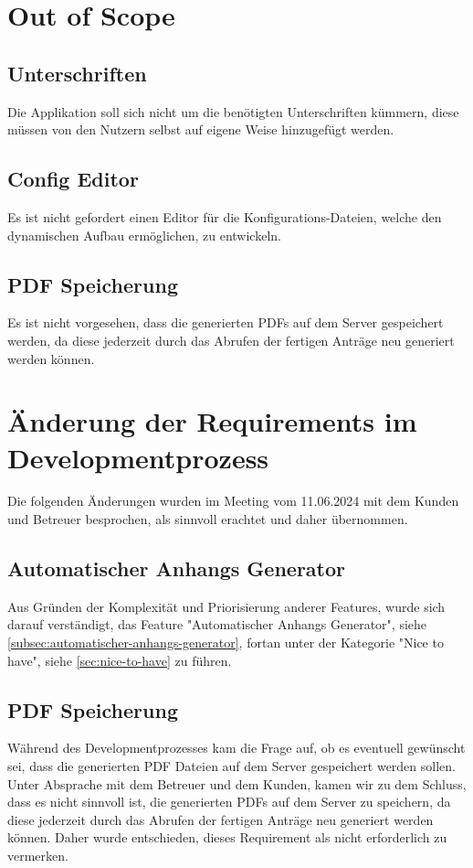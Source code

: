 \section{Out of Scope}\label{sec:nicht-anforderung}
\subsection{Unterschriften}\label{subsec:unterschriften}
Die Applikation soll sich nicht um die benötigten Unterschriften kümmern,
diese müssen von den Nutzern selbst auf eigene Weise hinzugefügt werden.
\subsection{Config Editor}\label{subsec:config-editor}
Es ist nicht gefordert einen Editor für die Konfigurations-Dateien, welche den dynamischen Aufbau ermöglichen, zu entwickeln.


\subsection{PDF Speicherung}\label{subsec: pdf speicherung}
Es ist nicht vorgesehen, dass die generierten \ac{PDF}s auf dem Server gespeichert werden, 
da diese jederzeit durch das Abrufen der fertigen Anträge neu generiert werden können.

\section{Änderung der Requirements im Developmentprozess}
Die folgenden Änderungen wurden im Meeting vom 11.06.2024 mit dem Kunden und Betreuer 
besprochen, als sinnvoll erachtet und daher übernommen.

\subsection{Automatischer Anhangs Generator}
Aus Gründen der Komplexität und Priorisierung anderer Features, wurde sich darauf verständigt, das Feature "Automatischer Anhangs Generator", siehe \ref{subsec:automatischer-anhangs-generator}, fortan unter der Kategorie "Nice to have", siehe \ref{sec:nice-to-have} 
zu führen.

\subsection{\ac{PDF} Speicherung}\label{subsec: pdf speicherung}
Während des Developmentprozesses kam die Frage auf, ob es eventuell gewünscht sei, dass die 
generierten \ac{PDF} Dateien auf dem Server gespeichert werden sollen.
Unter Absprache mit dem Betreuer und dem Kunden, kamen wir zu dem Schluss, dass
es nicht sinnvoll ist, die generierten \ac{PDF}s auf dem Server zu speichern, 
da diese jederzeit durch das Abrufen der fertigen Anträge neu generiert werden können. 
Daher wurde entschieden, dieses Requirement als nicht erforderlich zu vermerken.